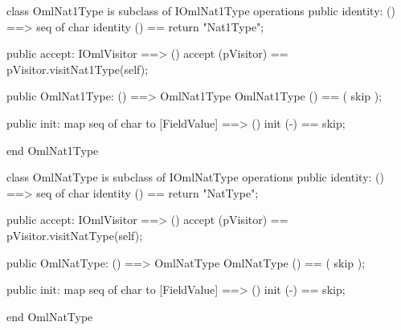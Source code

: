 \begin{vdm_al}
class OmlNat1Type is subclass of IOmlNat1Type
operations
  public identity: () ==> seq of char
  identity () == return "Nat1Type";

  public accept: IOmlVisitor ==> ()
  accept (pVisitor) == pVisitor.visitNat1Type(self);

  public OmlNat1Type:
      () ==> OmlNat1Type
  OmlNat1Type () == 
    ( skip );

  public init: map seq of char to [FieldValue] ==> ()
  init (-) == skip;

end OmlNat1Type
\end{vdm_al}

\begin{vdm_al}
class OmlNatType is subclass of IOmlNatType
operations
  public identity: () ==> seq of char
  identity () == return "NatType";

  public accept: IOmlVisitor ==> ()
  accept (pVisitor) == pVisitor.visitNatType(self);

  public OmlNatType:
      () ==> OmlNatType
  OmlNatType () == 
    ( skip );

  public init: map seq of char to [FieldValue] ==> ()
  init (-) == skip;

end OmlNatType
\end{vdm_al}

